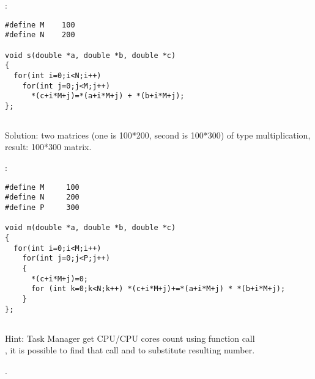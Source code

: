 :

\begin{lstlisting}
#define M    100
#define N    200

void s(double *a, double *b, double *c)
{
  for(int i=0;i<N;i++)
    for(int j=0;j<M;j++)
      *(c+i*M+j)=*(a+i*M+j) + *(b+i*M+j);
};
\end{lstlisting}

\subsection{}

{Solution: two matrices (one is 100*200, second is 100*300) of \Tdouble type multiplication, result: 100*300
matrix.}

:

\begin{lstlisting}
#define M     100
#define N     200
#define P     300

void m(double *a, double *b, double *c)
{
  for(int i=0;i<M;i++)
    for(int j=0;j<P;j++)
    {
      *(c+i*M+j)=0;
      for (int k=0;k<N;k++) *(c+i*M+j)+=*(a+i*M+j) * *(b+i*M+j);
    }
};
\end{lstlisting}

\subsection{}

{Hint: Task Manager get CPU/CPU cores count using function call \\
, it is possible to find that
call and to substitute resulting number.}

.

\subsection{}

